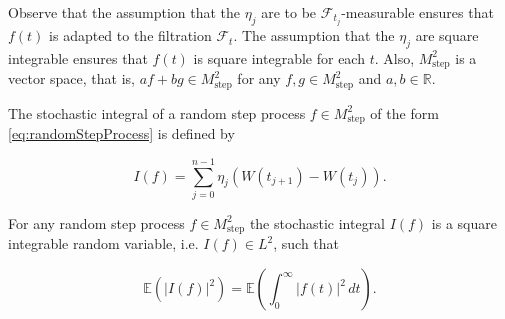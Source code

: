 Observe that the assumption that the $\eta_j$ are to be $\mathcal{F}_{t_j}$-measurable ensures that $f(t)$ is adapted to the filtration $\mathcal{F}_t$. The assumption that the $\eta_j$ are square integrable ensures that $f(t)$ is square integrable for each $t$. Also, $M_{\mathrm{step}}^2$ is a vector space, that is, $af + bg \in M_{\mathrm{step}}^2$ for any $f, g \in M_{\mathrm{step}}^2$ and $a, b \in \mathbb{R}$.

\begin{Definition}
\label{def:7.2}
The stochastic integral of a random step process $f \in M_{\mathrm{step}}^2$ of the form \eqref{eq:randomStepProcess} is defined by

\begin{equation}
I(f) = \sum_{j=0}^{n-1} \eta_j\left(W(t_{j+1}) - W(t_j)\right).
\label{eq:stochasticIntegral}
\end{equation}
\end{Definition}

\begin{Proposition}
\label{prop:7.1}
For any random step process $f \in M_{\mathrm{step}}^2$ the stochastic integral $I(f)$ is a square integrable random variable, i.e. $I(f) \in L^2$, such that

\begin{equation}
\mathbb{E}\left(|I(f)|^2\right) = \mathbb{E}\left(\int_0^\infty |f(t)|^2 \, dt\right).
\end{equation}
\end{Proposition}

